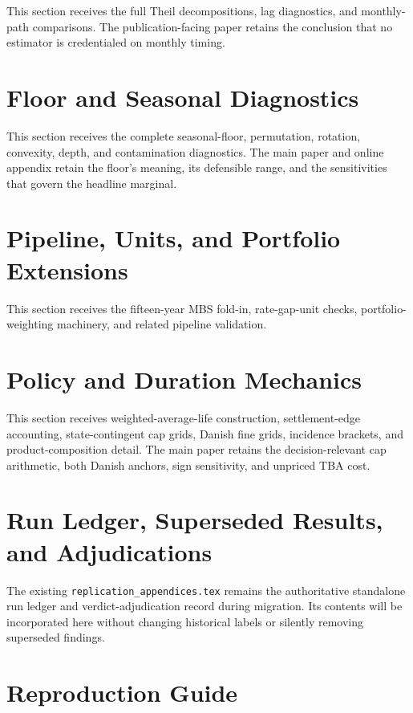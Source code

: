 \documentclass[12pt]{article}
\begin{document}
This section receives the full Theil decompositions, lag diagnostics, and
monthly-path comparisons. The publication-facing paper retains the conclusion
that no estimator is credentialed on monthly timing.

\section{Floor and Seasonal Diagnostics}\label{supp:floor-diagnostics}

This section receives the complete seasonal-floor, permutation, rotation,
convexity, depth, and contamination diagnostics. The main paper and online
appendix retain the floor's meaning, its defensible range, and the sensitivities
that govern the headline marginal.

\section{Pipeline, Units, and Portfolio Extensions}\label{supp:pipeline}

This section receives the fifteen-year MBS fold-in, rate-gap-unit checks,
portfolio-weighting machinery, and related pipeline validation.

\section{Policy and Duration Mechanics}\label{supp:policy-mechanics}

This section receives weighted-average-life construction, settlement-edge
accounting, state-contingent cap grids, Danish fine grids, incidence brackets,
and product-composition detail. The main paper retains the decision-relevant
cap arithmetic, both Danish anchors, sign sensitivity, and unpriced TBA cost.

\section{Run Ledger, Superseded Results, and Adjudications}\label{supp:ledger}

The existing \texttt{replication\_appendices.tex} remains the authoritative
standalone run ledger and verdict-adjudication record during migration. Its
contents will be incorporated here without changing historical labels or
silently removing superseded findings.

\section{Reproduction Guide}\label{supp:reproduction}
\end{document}

